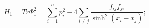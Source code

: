\begin{equation}\label{H1}
  H_1=Tr \Phi_1^2= \sum_{i=1}^n p_i^2- 4 \sum_{i\neq j} \frac
  {f_{ij}f_{ji}} {\sinh^2(x_i-x_j)};
\end{equation}

